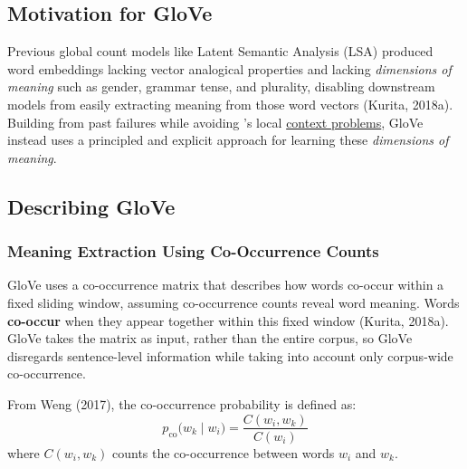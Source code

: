 \subsection{Motivation for GloVe} \label{sec:MotivationGlove}

Previous global count models like Latent Semantic Analysis (LSA) produced word embeddings lacking vector analogical properties and lacking \emph{dimensions of meaning} such as gender, grammar tense, and plurality, disabling downstream models from easily extracting meaning from those word vectors (Kurita, 2018a). Building from past failures while avoiding 's local \hyperref[sec:ProblemWord2VecFromGloveStandpoint]{context problems}, GloVe instead uses a principled and explicit approach for learning these \emph{dimensions of meaning}.


\subsection{Describing GloVe} \label{sec:DefGlove}



\subsubsection{Meaning Extraction Using Co-Occurrence Counts}

GloVe uses a co-occurrence matrix that describes how words co-occur within a fixed sliding window, assuming co-occurrence counts reveal word meaning. Words \textbf{co-occur} when they appear together within this fixed window (Kurita, 2018a). GloVe takes the matrix as input, rather than the entire corpus, so GloVe disregards sentence-level information while taking into account only corpus-wide co-occurrence. 

From Weng (2017), the co-occurrence probability is defined as: 
$$
p_{\text{co}} \Big(w_k \; | \; w_i \Big) = \frac{C(w_i, w_k)}{C(w_i)}
$$
where $C(w_i, w_k)$ counts the co-occurrence between words $w_i$ and $w_k$.  

